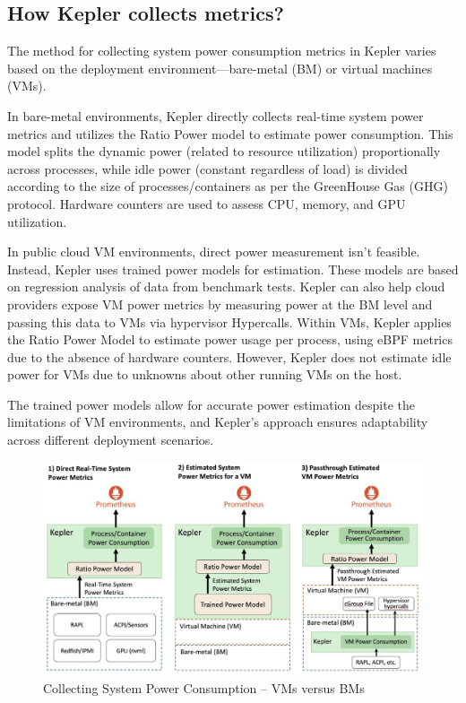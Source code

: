 \subsection{How Kepler collects metrics?}
The method for collecting system power consumption metrics in Kepler varies based on the deployment environment—bare-metal (BM) or virtual machines (VMs).

In bare-metal environments, Kepler directly collects real-time system power metrics and utilizes the Ratio Power model to estimate power consumption. This model splits the dynamic power (related to resource utilization) proportionally across processes, while idle power (constant regardless of load) is divided according to the size of processes/containers as per the GreenHouse Gas (GHG) protocol. Hardware counters are used to assess CPU, memory, and GPU utilization.

In public cloud VM environments, direct power measurement isn't feasible. Instead, Kepler uses trained power models for estimation. These models are based on regression analysis of data from benchmark tests. Kepler can also help cloud providers expose VM power metrics by measuring power at the BM level and passing this data to VMs via hypervisor Hypercalls. Within VMs, Kepler applies the Ratio Power Model to estimate power usage per process, using eBPF metrics due to the absence of hardware counters. However, Kepler does not estimate idle power for VMs due to unknowns about other running VMs on the host.

The trained power models allow for accurate power estimation despite the limitations of VM environments, and Kepler's approach ensures adaptability across different deployment scenarios.


\begin{figure}[H]
  \centering
  \includegraphics[width=16cm]{Figures/kepler-system-power-consumption.jpg}
  \caption{Collecting System Power Consumption – VMs versus BMs}
\end{figure}



